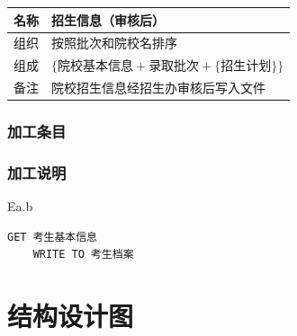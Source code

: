 \documentclass[CJK,utf8]{ctexrep}
\begin{document}
\begin{tabularx}{0.85\textwidth}{|l|X|}
	\hline
	\textbf{名称} & \textbf{招生信息（审核后）} \\
	\hline
	组织 & 按照批次和院校名排序 \\
	\hline
	组成 & $\lbrace\text{院校基本信息}+\text{录取批次}+
	\lbrace\text{招生计划}\rbrace\rbrace$ \\
	\hline
	备注 & 院校招生信息经招生办审核后写入文件 \\
	\hline
\end{tabularx}

\subsubsection*{加工条目}

\subsubsection*{加工说明}

Ea.b
\begin{lstlisting}[style=proc]
	GET 考生基本信息
	WRITE TO 考生档案
\end{lstlisting}

\section*{结构设计图}
\end{document}
